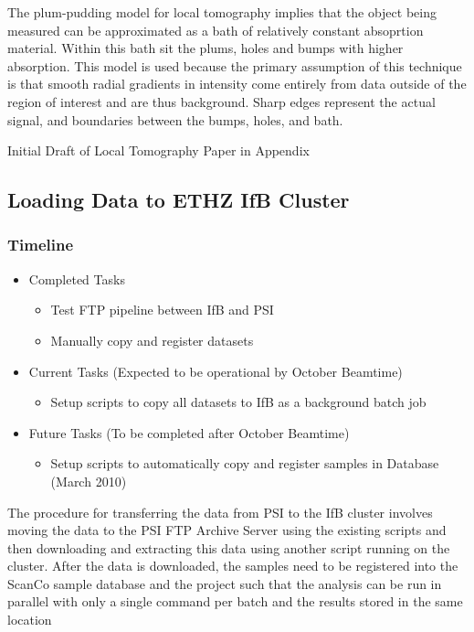 The plum-pudding model for local tomography implies that the object being measured can be approximated as a bath of relatively constant absoprtion material. Within this bath sit the plums, holes and bumps with higher absorption. This model is used because the primary assumption of this technique is that smooth radial gradients in intensity come entirely from data outside of the region of interest and are thus background. Sharp edges represent the actual signal, and boundaries between the bumps, holes, and bath.

Initial Draft of Local Tomography Paper in Appendix

\subsection{Loading Data to ETHZ IfB Cluster}
\subsubsection*{Timeline}
\begin{itemize}
 	\item Completed Tasks
	\begin{itemize}
		\item Test FTP pipeline between IfB and PSI
		\item Manually copy and register datasets
	\end{itemize}
	\item Current Tasks (Expected to be operational by October Beamtime)
	\begin{itemize}
		\item Setup scripts to copy all datasets to IfB as a background batch job
	\end{itemize}
	\item Future Tasks (To be completed after October Beamtime)
	\begin{itemize}
		\item Setup scripts to automatically copy and register samples in Database (March 2010)
	\end{itemize}
\end{itemize}

The procedure for transferring the data from PSI to the IfB cluster involves moving the data to the PSI FTP Archive Server using the existing scripts and then downloading and extracting this data using another script running on the cluster.
After the data is downloaded, the samples need to be registered into the ScanCo sample database and the project such that the analysis can be run in parallel with only a single command per batch and the results stored in the same location

